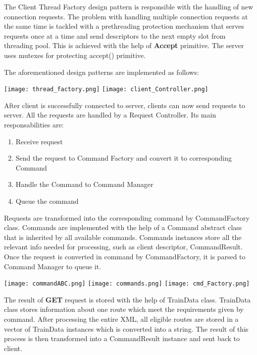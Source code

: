 \documentclass[runningheads]{llncs}
\begin{document}
The Client Thread Factory design pattern is responsible with the handling of new connection requests. The problem with handling multiple connection requests at the same time is tackled with a prethreading protection mechanism that serves requests once at a time and send descriptors to the next empty slot from threading pool. This is achieved with the help of \textbf{Accept} primitive. The server uses mutexes for protecting accept() primitive.

The aforementioned design patterns are implemented as follows:

\vspace{5mm}

\hspace*{-0.3in}
\texttt{[image: thread\_factory.png]}
\texttt{[image: client\_Controller.png]}

\vspace{5mm}



After client is successfully connected to server, clients can now send requests to server. All the requests are handled by a Request Controller. Its main responsabilities are:


\begin{enumerate}
    \item Receive request
    \item Send the request to Command Factory and convert it to corresponding Command
    \item Handle the Command to Command Manager
    \item Queue the command
\end{enumerate}

Requests are transformed into the corresponding command by CommandFactory class. Commands are implemented with the help of a Command abstract class that is inherited by all available commands. Commands instances store all the relevant info needed for processing, such as client descriptor, CommandResult. Once the request is converted in command by CommandFactory, it is parsed to Command Manager to queue it. 

\vspace{5mm}

\hspace*{-1.3in}
\texttt{[image: commandABC.png]}
\texttt{[image: commands.png]}
\texttt{[image: cmd\_Factory.png]}

The result of \textbf{GET} request is stored with the help of TrainData class. TrainData class stores information about one route which meet the requirements given by command. After processing the entire XML, all eligible routes are stored in a vector of TrainData instances which is converted into a string. The result of this process is then transformed into a CommandResult instance and sent back to client.
\vspace{2mm}
\end{document}
